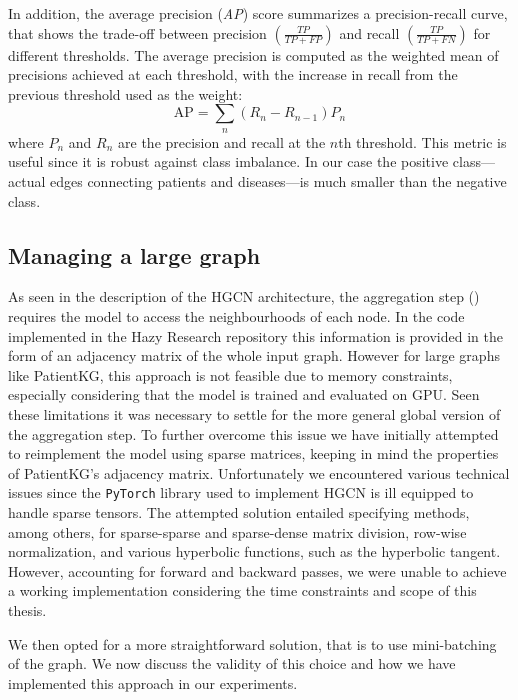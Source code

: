 In addition, the average precision (\emph{AP}) score summarizes a precision-recall curve, that shows the trade-off between precision $\left(\frac{TP}{TP+FP}\right)$ and recall $\left(\frac{TP}{TP+FN}\right)$ for different thresholds. The average precision is computed as the weighted mean of precisions achieved at each threshold, with the increase in recall from the previous threshold used as the weight:
\begin{equation*}
  \text{AP} = \sum_n (R_n - R_{n-1}) P_n
\end{equation*} 
where $P_n$ and $R_n$ are the precision and recall at the $n$th threshold.
This metric is useful since it is robust against class imbalance. In our case the positive class—actual edges connecting patients and diseases—is much smaller than the negative class.

\subsection{Managing a large graph}
As seen in the description of the HGCN architecture, the aggregation step () requires the model to access the neighbourhoods of each node. In the code implemented in the Hazy Research repository this information is provided in the form of an adjacency matrix of the whole input graph. However for large graphs like PatientKG, this approach is not feasible due to memory constraints, especially considering that the model is trained and evaluated on GPU.
Seen these limitations it was necessary to settle for the more general global version of the aggregation step. 
To further overcome this issue we have initially attempted to reimplement the model using sparse matrices, keeping in mind the properties of PatientKG's adjacency matrix. Unfortunately we encountered various technical issues since the \texttt{PyTorch} library used to implement HGCN is ill equipped to handle sparse tensors. The attempted solution entailed specifying methods, among others, for sparse-sparse and sparse-dense matrix division, row-wise normalization, and various hyperbolic functions, such as the hyperbolic tangent. However, accounting for forward and backward passes, we were unable to achieve a working implementation considering the time constraints and scope of this thesis.

We then opted for a more straightforward solution, that is to use mini-batching of the graph. We now discuss the validity of this choice and how we have implemented this approach in our experiments.

